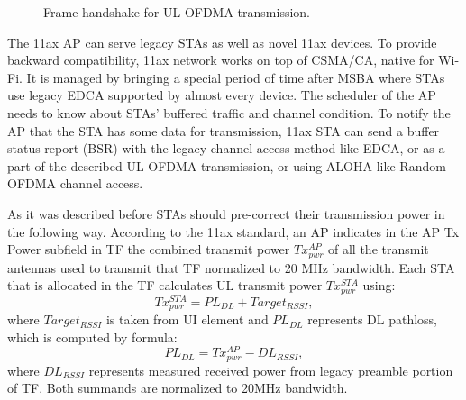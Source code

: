 \begin{figure}[t]
{}
	\caption{\label{fig:transmission} Frame handshake for UL OFDMA transmission.}
	\vspace{-0.5em}
\end{figure}

The 11ax AP can serve legacy STAs as well as novel 11ax devices. 
To provide backward compatibility, 11ax network works on top of CSMA/CA, native for Wi-Fi.
It is managed by bringing a special period of time after MSBA where STAs use legacy EDCA supported by almost every device. 
The scheduler of the AP needs to know about STAs' buffered traffic and channel condition.
To notify the AP that the STA has some data for transmission, 11ax STA can send a buffer status report (BSR) with the legacy channel access method like EDCA, or as a part of the described UL OFDMA transmission, or using ALOHA-like Random OFDMA channel access.

As it was described before STAs should pre-correct their transmission power in the following way. 
According to the 11ax standard, an AP indicates in the AP Tx Power  subfield in TF the combined transmit power $Tx^{AP}_{pwr}$ of all the transmit antennas used to transmit that TF normalized to 20 MHz bandwidth. 
Each STA that is allocated in the TF calculates UL transmit power $Tx_{pwr}^{STA}$ using:
\begin{equation}
Tx_{pwr}^{STA} = PL_{DL} + Target_{RSSI},
\end{equation}
where $Target_{RSSI}$ is taken from UI element and $PL_{DL}$ represents DL pathloss, which is computed by formula:
\begin{equation}
PL_{DL} = Tx^{AP}_{pwr} - DL_{RSSI},
\end{equation}
where $DL_{RSSI}$ represents measured received power from legacy preamble portion of TF. Both summands are normalized to 20MHz bandwidth. 


